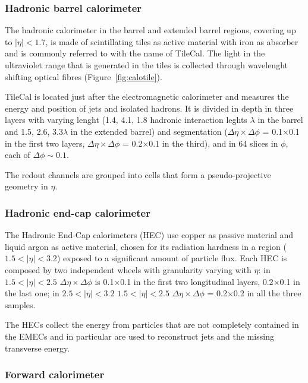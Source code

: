 \subsubsection{Hadronic barrel calorimeter}\label{sec:hadcalbarrel}

The hadronic calorimeter in the barrel and extended barrel regions,
covering up to $|\eta|<1.7$, is made of scintillating tiles as active material with 
iron as absorber
and is commonly referred to with the name of TileCal. 
The light in the ultraviolet range that is generated in the tiles is collected through
wavelenght shifting optical fibres (Figure~\ref{fig:calotile}).

TileCal is located just after the electromagnetic
calorimeter and measures the energy and position of jets and isolated hadrons.
It is divided in depth in three layers with varying lenght (1.4, 4.1, 1.8 hadronic interaction
leghts $\lambda$ in the barrel and 1.5, 2.6, 3.3$\lambda$ in the extended barrel) and segmentation
($\Delta\eta\times\Delta\phi$ = 0.1$\times$0.1 in the first two layers,
$\Delta\eta\times\Delta\phi$ = 0.2$\times$0.1 in the third),
and in 64 slices in $\phi$, each of $\Delta\phi\sim0.1$.

The redout channels are grouped into cells that form a pseudo-projective geometry in $\eta$.

\subsubsection{Hadronic end-cap calorimeter}\label{sec:hadcalendcap}

The Hadronic End-Cap calorimeters (HEC) use copper as passive material and liquid
argon as active material, chosen for its radiation hardness in a region ($1.5<|\eta|<3.2$)
exposed to a significant amount of particle flux. Each HEC is composed by
two independent wheels with granularity varying with $\eta$: 
in $1.5<|\eta|<2.5$ $\Delta\eta\times\Delta\phi$ is 0.1$\times$0.1 in the first
two longitudinal layers,  0.2$\times$0.1 in the last one; in
$2.5<|\eta|<3.2$ $1.5<|\eta|<2.5$ $\Delta\eta\times\Delta\phi$ = 0.2$\times$0.2
in all the three samples.

The HECs collect the energy from particles that are not completely contained
in the EMECs and in particular are used to reconstruct jets and the missing transverse
energy.

\subsubsection{Forward calorimeter}\label{sec:calforward}

